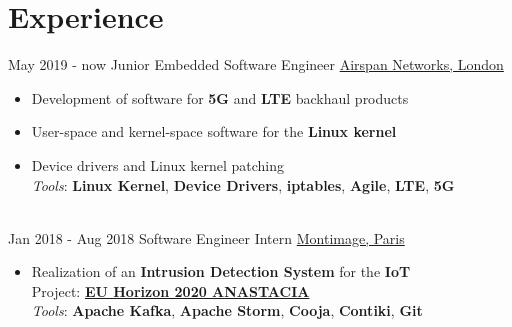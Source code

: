 \documentclass[letterpaper]{twentysecondcv} %
\begin{document}
\makeprofile %


\section{Experience}

\begin{twenty} %
    \twentyitem
    	{May 2019 -}
		{now}
        {Junior Embedded Software Engineer}
        {\href{https://www.airspan.com/}{Airspan Networks, London}}
        {}
        {
            \begin{itemize}
                \item Development of software for \textbf{5G} and \textbf{LTE} backhaul products            
                \item User-space and kernel-space software for the \textbf{Linux kernel}
                \item Device drivers and Linux kernel patching
\\                %
                \textit{Tools}: \textbf{Linux Kernel}, \textbf{Device Drivers}, \textbf{iptables}, \textbf{Agile}, \textbf{LTE}, \textbf{5G}
            \end{itemize}
        }\\
    \twentyitem
    	{Jan 2018 -}
		{Aug 2018}
        {Software Engineer Intern}
        {\href{https://www.montimage.com/}{Montimage, Paris}}
        {}
        {
            \begin{itemize}
                \item Realization of an \textbf{Intrusion Detection System} for the \textbf{IoT}\\
                Project: \href{http://www.anastacia-h2020.eu/}{\textbf{EU Horizon 2020 ANASTACIA}}\\
                \textit{Tools}: \textbf{Apache Kafka}, \textbf{Apache Storm}, \textbf{Cooja}, \textbf{Contiki}, \textbf{Git}

\end{itemize}}
\end{twenty}
\end{document}
